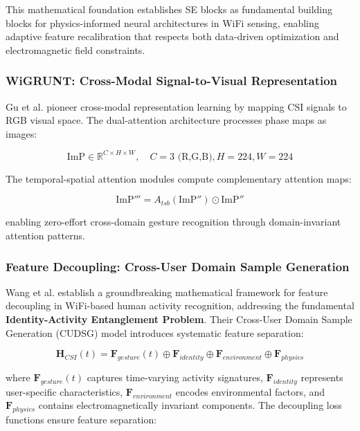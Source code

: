 \documentclass[journal]{IEEEtran}
\begin{document}
This mathematical foundation establishes SE blocks as fundamental building blocks for physics-informed neural architectures in WiFi sensing, enabling adaptive feature recalibration that respects both data-driven optimization and electromagnetic field constraints.

\subsubsection{WiGRUNT: Cross-Modal Signal-to-Visual Representation}

Gu et al. \cite{gu2022wigrunt} pioneer cross-modal representation learning by mapping CSI signals to RGB visual space. The dual-attention architecture processes phase maps as images:

\begin{equation}
\text{ImP} \in \mathbb{R}^{C \times H \times W}, \quad C=3 \text{ (R,G,B)}, H=224, W=224
\label{eq:wigrunt_rgb_mapping}
\end{equation}

The temporal-spatial attention modules compute complementary attention maps:

\begin{equation}
\text{ImP}''' = A_{tsb}(\text{ImP}'') \odot \text{ImP}''
\label{eq:wigrunt_dual_attention}
\end{equation}

enabling zero-effort cross-domain gesture recognition through domain-invariant attention patterns.

\subsubsection{Feature Decoupling: Cross-User Domain Sample Generation}

Wang et al. \cite{wang2024feature} establish a groundbreaking mathematical framework for feature decoupling in WiFi-based human activity recognition, addressing the fundamental \textbf{Identity-Activity Entanglement Problem}. Their Cross-User Domain Sample Generation (CUDSG) model introduces systematic feature separation:

\begin{equation}
\mathbf{H}_{CSI}(t) = \mathbf{F}_{gesture}(t) \oplus \mathbf{F}_{identity} \oplus \mathbf{F}_{environment} \oplus \mathbf{F}_{physics}
\label{eq:feature_decomposition_wang}
\end{equation}

where $\mathbf{F}_{gesture}(t)$ captures time-varying activity signatures, $\mathbf{F}_{identity}$ represents user-specific characteristics, $\mathbf{F}_{environment}$ encodes environmental factors, and $\mathbf{F}_{physics}$ contains electromagnetically invariant components. The decoupling loss functions ensure feature separation:
\end{document}
